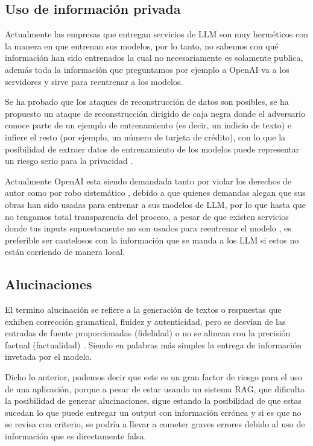 \subsection{Uso de información privada}

Actualmente las empresas que entregan servicios de LLM son muy herméticos con la manera en que entrenan sus modelos, por lo tanto, no sabemos 
con qué información han sido entrenados la cual no necesariamente es solamente publica, además toda la información que preguntamos por ejemplo a 
OpenAI va a los servidores y sirve para reentrenar a los modelos.

Se ha probado que los ataques de reconstrucción de datos son posibles, se ha propuesto un ataque de reconstrucción dirigido de caja negra donde el 
adversario conoce parte de un ejemplo de entrenamiento (es decir, un indicio de texto) e infiere el resto (por ejemplo, un número de tarjeta de crédito), 
con lo que la posibilidad de extraer datos de entrenamiento de los modelos puede representar un riesgo serio para la privacidad \cite{privacidad1}. 

Actualmente OpenAI esta siendo demandada tanto por violar los derechos de autor \cite{privacidad3} como por robo sistemático \cite{privacidad2}, debido a que quienes 
demandas alegan que sus obras han sido usadas para entrenar a sus modelos de LLM, por lo que hasta que no tengamos total transparencia del proceso, 
a pesar de que existen servicios donde tus inputs supuestamente no son usados para reentrenar el modelo \cite{openai4}, es preferible ser cautelosos con la 
información que se manda a los LLM si estos no están corriendo de manera local.


\subsection{Alucinaciones}

El termino alucinación se refiere a la generación de textos o respuestas que exhiben corrección gramatical, fluidez y autenticidad,
pero se desvían de las entradas de fuente proporcionadas (fidelidad) o no se alinean con la precisión factual (factualidad) \cite{alucionacion1}.
Siendo en palabras más simples la entrega de información invetada por el modelo.

Dicho lo anterior, podemos decir que este es un gran factor de riesgo para el uso de una aplicación, porque a pesar de estar usando un 
sistema RAG, que dificulta la posibilidad de generar alucinaciones, sigue estando la posibilidad de que estas sucedan lo que puede 
entregar un output con información errónea y si es que no se revisa con criterio, se podría a llevar a cometer graves errores debido 
al uso de información que es directamente falsa.


